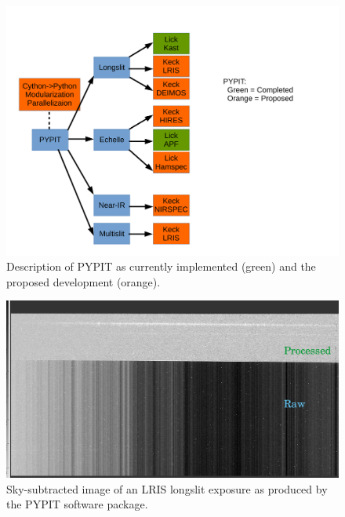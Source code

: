 \documentclass[12pt,preprint]{aastex}
\begin{document}
\clearpage

\begin{figure}
 \vskip -0.5in
\begin{center}
\includegraphics[scale=0.40]{code_sketch.pdf}
\end{center}
 \caption{\footnotesize  
Description of PYPIT as currently implemented (green)
and the proposed development (orange).
}\label{fig:PYPIT}
\end{figure}

\begin{figure}
 \vskip -0.5in
\begin{center}
\includegraphics[scale=0.50]{processed_image.png}
\end{center}
 \caption{\footnotesize  
 Sky-subtracted image of an LRIS longslit exposure as 
 produced by the PYPIT software package.
}\label{fig:LRIS_example}
\end{figure}
\end{document}
